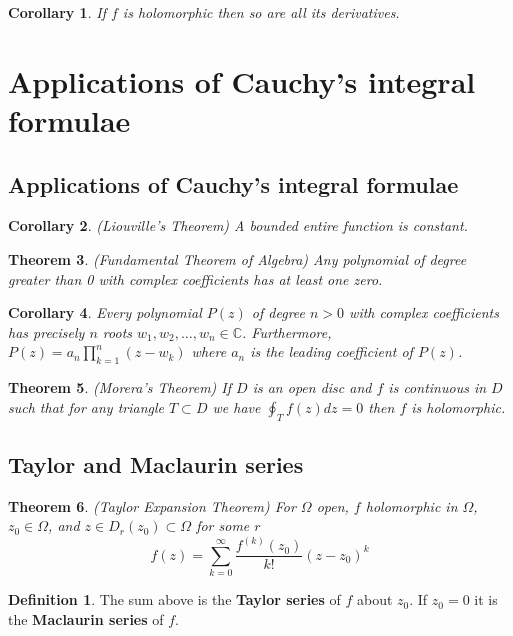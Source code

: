 \documentclass[12pt]{article}
\newtheorem{thm}{Theorem}[section]
\newtheorem{cor}[thm]{Corollary}
\theoremstyle{definition}
\newtheorem{defn}{Definition}[section]
\newcommand{\C}{\mathbb{C}}
\begin{document}
\begin{cor}
  If $f$ is holomorphic then so are all its derivatives.
\end{cor}

\section{Applications of Cauchy's integral formulae}

\subsection{Applications of Cauchy's integral formulae}

\begin{cor}
  (Liouville's Theorem)
  A bounded entire function is constant.
\end{cor}

\begin{thm}
  (Fundamental Theorem of Algebra)
  Any polynomial of degree greater than 0 with complex coefficients has at least one zero.
\end{thm}

\begin{cor}
  Every polynomial $P(z)$ of degree $n > 0$ with complex coefficients has precisely $n$ roots $w_1, w_2, \ldots, w_n \in \C$.
  Furthermore, $P(z) = a_n\prod_{k = 1}^n(z - w_k)$ where $a_n$ is the leading coefficient of $P(z)$.
\end{cor}

\begin{thm}
  (Morera's Theorem)
  If $D$ is an open disc and $f$ is continuous in $D$ such that for any triangle $T \subset D$ we have $\oint_Tf(z)dz = 0$ then $f$ is holomorphic.
\end{thm}
\subsection{Taylor and Maclaurin series}

\begin{thm}
  (Taylor Expansion Theorem)
  For $\Omega$ open, $f$ holomorphic in $\Omega$, $z_0 \in \Omega$, and $z \in D_r(z_0) \subset \Omega$ for some $r$
  $$f(z) = \sum_{k = 0}^{\infty}\frac{f^{(k)}(z_0)}{k!}(z - z_0)^k$$
\end{thm}

\begin{defn}
  The sum above is the \textbf{Taylor series} of $f$ about $z_0$.
  If $z_0 = 0$ it is the \textbf{Maclaurin series} of $f$.
\end{defn}
\end{document}
